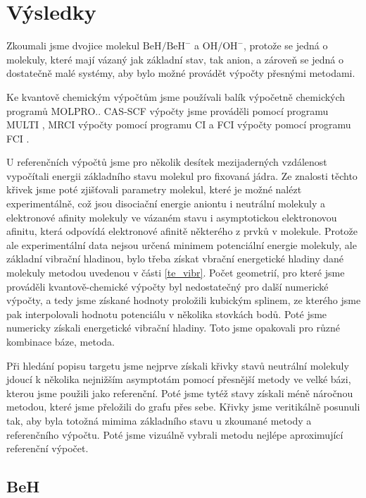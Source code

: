 \chapter{Výsledky}
Zkoumali jsme dvojice molekul $\mathrm{BeH/BeH^-}$ a $\mathrm{OH/OH^-}$, protože se jedná o 
molekuly, které mají vázaný jak základní stav, tak anion, a zároveň se jedná o 
dostatečně malé systémy, aby bylo možné provádět výpočty přesnými metodami.

Ke kvantově chemickým výpočtům jsme používali balík výpočetně chemických programů 
MOLPRO.\cite{MOLPRO-WIREs, MOLPRO}.
CAS-SCF výpočty jsme prováděli pomocí programu MULTI \cite{WK85,KW85}, MRCI výpočty 
pomocí programu CI \cite{KW92} a FCI výpočty pomocí programu FCI \cite{KH84,KH89}.

U referenčních výpočtů jsme pro několik desítek mezijaderných vzdálenost vypočítali 
energii základního stavu molekul pro fixovaná jádra. Ze znalosti těchto křivek jsme 
poté zjišťovali parametry molekul, které je 
možné nalézt experimentálně, což jsou disociační energie aniontu i neutrální molekuly 
a 
elektronové afinity molekuly  ve vázaném stavu i asymptotickou elektronovou afinitu, 
která odpovídá 
elektronové afinitě některého z prvků v molekule.  Protože ale experimentální 
data nejsou určená minimem potenciální energie molekuly, ale základní vibrační 
hladinou, bylo třeba získat vbrační energetické hladiny dané molekuly metodou uvedenou 
v části \ref{te_vibr}. Počet geometrií, pro které jsme 
prováděli kvantově-chemické výpočty byl nedostatečný pro další numerické výpočty, a 
tedy jsme získané hodnoty proložili kubickým splinem, ze kterého jsme pak 
interpolovali hodnotu potenciálu v několika stovkách bodů. Poté jsme numericky získali 
energetické vibrační hladiny. Toto jsme opakovali pro různé kombinace báze, metoda.

Při hledání popisu targetu jsme nejprve získali křivky stavů neutrální molekuly jdoucí 
k několika nejnižším asymptotám pomocí přesnější metody ve velké bázi, kterou jsme 
použili jako referenční. Poté jsme tytéž stavy získali méně náročnou metodou, které 
jsme přeložili do grafu přes sebe. Křivky jsme veritikálně posunuli tak, aby byla 
totožná mimima základního stavu u zkoumané metody a referenčního výpočtu. Poté jsme 
vizuálně vybrali metodu nejlépe aproximující referenční výpočet.

\section{BeH}

